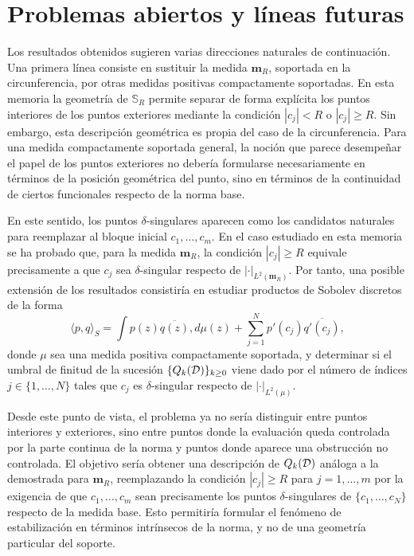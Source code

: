 \section{Problemas abiertos y líneas futuras}

Los resultados obtenidos sugieren varias direcciones naturales de continuación.
Una primera línea consiste en sustituir la medida \(\mathbf{m}_R\), soportada en la
circunferencia, por otras medidas positivas compactamente soportadas. En esta
memoria la geometría de \(\mathbb{S}_R\) permite separar de forma explícita los
puntos interiores de los puntos exteriores mediante la condición \(|c_j|<R\) o
\(|c_j|\ge R\). Sin embargo, esta descripción geométrica es propia del caso de la
circunferencia. Para una medida compactamente soportada general, la noción que
parece desempeñar el papel de los puntos exteriores no debería formularse
necesariamente en términos de la posición geométrica del punto, sino en términos
de la continuidad de ciertos funcionales respecto de la norma base.

En este sentido, los puntos \(\delta\)-singulares aparecen como los candidatos
naturales para reemplazar al bloque inicial \(c_1,\dots,c_m\). En el caso estudiado
en esta memoria se ha probado que, para la medida \(\mathbf{m}_R\), la condición
\(|c_j|\ge R\) equivale precisamente a que \(c_j\) sea \(\delta\)-singular respecto de
\(|\cdot|_{L^2(\mathbf m_R)}\). Por tanto, una posible extensión de los resultados
consistiría en estudiar productos de Sobolev discretos de la forma
\[
	\langle p,q\rangle_S
	=
	\int p(z)\overline{q(z)},d\mu(z)
	+
	\sum_{j=1}^N p'(c_j)\overline{q'(c_j)},
\]
donde \(\mu\) sea una medida positiva compactamente soportada, y determinar si el
umbral de finitud de la sucesión \(\{Q_k(\mathcal{D})\}_{k\ge0}\) viene dado por el número
de índices \(j\in\{1,\dots,N\}\) tales que \(c_j\) es \(\delta\)-singular respecto de
\(|\cdot|_{L^2(\mu)}\).

Desde este punto de vista, el problema ya no sería distinguir entre puntos
interiores y exteriores, sino entre puntos donde la evaluación queda controlada
por la parte continua de la norma y puntos donde aparece una obstrucción no
controlada. El objetivo sería obtener una descripción de \(Q_k(\mathcal{D})\) análoga a la
demostrada para \(\mathbf m_R\), reemplazando la condición \(|c_j|\ge R\) para
\(j=1,\dots,m\) por la exigencia de que \(c_1,\dots,c_m\) sean precisamente los puntos
\(\delta\)-singulares de \(\{c_1,\dots,c_N\}\) respecto de la medida
base. Esto permitiría formular el fenómeno de estabilización en términos
intrínsecos de la norma, y no de una geometría particular del soporte.

